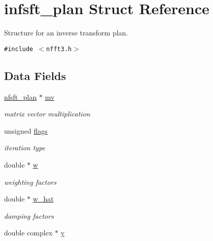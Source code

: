 \hypertarget{structinfsft__plan}{
\section{infsft\_\-plan Struct Reference}
\label{structinfsft__plan}
}
Structure for an inverse transform plan.  


{\tt \#include $<$nfft3.h$>$}

\subsection*{Data Fields}
\begin{CompactItemize}
\item 
\hypertarget{structinfsft__plan_o0}{
\hyperlink{structnfsft__plan}{nfsft\_\-plan} $\ast$ \hyperlink{structinfsft__plan_o0}{mv}}
\label{structinfsft__plan_o0}

\begin{CompactList}\small\item\em matrix vector multiplication \item\end{CompactList}\item 
\hypertarget{structinfsft__plan_o1}{
unsigned \hyperlink{structinfsft__plan_o1}{flags}}
\label{structinfsft__plan_o1}

\begin{CompactList}\small\item\em iteration type \item\end{CompactList}\item 
\hypertarget{structinfsft__plan_o2}{
double $\ast$ \hyperlink{structinfsft__plan_o2}{w}}
\label{structinfsft__plan_o2}

\begin{CompactList}\small\item\em weighting factors \item\end{CompactList}\item 
\hypertarget{structinfsft__plan_o3}{
double $\ast$ \hyperlink{structinfsft__plan_o3}{w\_\-hat}}
\label{structinfsft__plan_o3}

\begin{CompactList}\small\item\em damping factors \item\end{CompactList}\item 
\hypertarget{structinfsft__plan_o4}{
double complex $\ast$ \hyperlink{structinfsft__plan_o4}{y}}
\label{structinfsft__plan_o4}


\end{CompactItemize}
